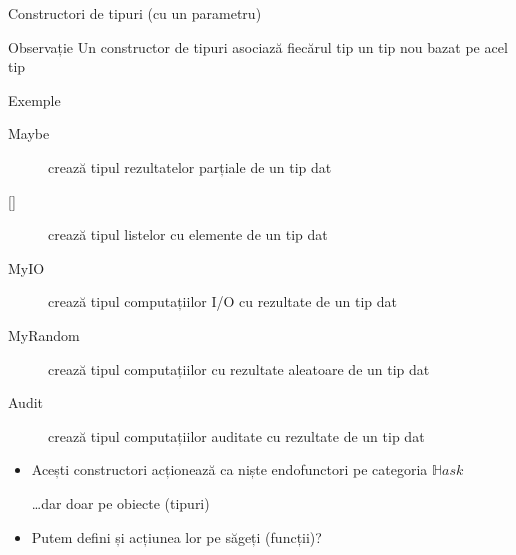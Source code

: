 \documentclass[xcolor=pdftex,romanian,colorlinks]{beamer}
\begin{document}
\begin{frame}[fragile]{Constructori de tipuri (cu un parametru)}

\begin{block}{Observație}
Un constructor de tipuri asociază fiecărul tip un tip nou bazat pe acel tip
\end{block}

\begin{block}{Exemple}
\begin{description}
\item[Maybe] crează tipul rezultatelor parțiale de un tip dat
\item[{[]}] crează tipul listelor cu elemente de un tip dat
\item[MyIO] crează tipul computațiilor I/O cu rezultate de un tip dat
\item[MyRandom] crează tipul computațiilor cu rezultate aleatoare de un tip dat
\item[Audit] crează tipul computațiilor auditate cu rezultate de un tip dat
\end{description}
\end{block}

\begin{itemize}
\item Acești constructori acționează ca niște endofunctori pe categoria $\mathbb{H}ask$

 \ldots dar doar pe obiecte (tipuri) 
 
\item Putem defini și acțiunea lor pe săgeți (funcții)?
\end{itemize}
\end{frame}
\end{document}
